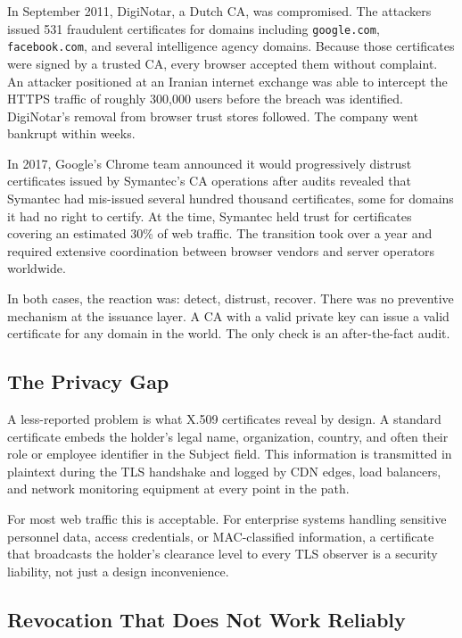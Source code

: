 \documentclass[12pt,a4paper]{article}
\begin{document}
In September 2011, DigiNotar, a Dutch CA, was compromised. The attackers issued 531 fraudulent certificates for domains including \texttt{google.com}, \texttt{facebook.com}, and several intelligence agency domains. Because those certificates were signed by a trusted CA, every browser accepted them without complaint. An attacker positioned at an Iranian internet exchange was able to intercept the HTTPS traffic of roughly 300,000 users before the breach was identified. DigiNotar's removal from browser trust stores followed. The company went bankrupt within weeks.

In 2017, Google's Chrome team announced it would progressively distrust certificates issued by Symantec's CA operations after audits revealed that Symantec had mis-issued several hundred thousand certificates, some for domains it had no right to certify. At the time, Symantec held trust for certificates covering an estimated 30\% of web traffic. The transition took over a year and required extensive coordination between browser vendors and server operators worldwide.

In both cases, the reaction was: detect, distrust, recover. There was no preventive mechanism at the issuance layer. A CA with a valid private key can issue a valid certificate for any domain in the world. The only check is an after-the-fact audit.

\subsection{The Privacy Gap}

A less-reported problem is what X.509 certificates reveal by design. A standard certificate embeds the holder's legal name, organization, country, and often their role or employee identifier in the Subject field. This information is transmitted in plaintext during the TLS handshake and logged by CDN edges, load balancers, and network monitoring equipment at every point in the path.

For most web traffic this is acceptable. For enterprise systems handling sensitive personnel data, access credentials, or MAC-classified information, a certificate that broadcasts the holder's clearance level to every TLS observer is a security liability, not just a design inconvenience.

\subsection{Revocation That Does Not Work Reliably}
\end{document}
